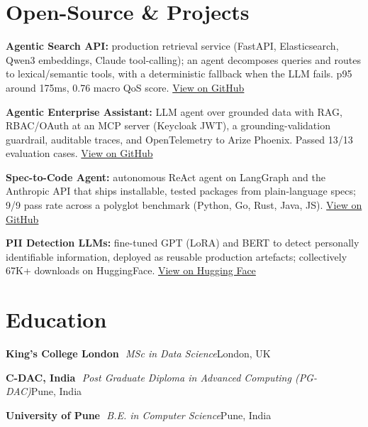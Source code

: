 \documentclass[10pt,a4paper]{article}
\newcommand{\sep}{\,\textcolor{accent!60}{\textbar}\,}
\begin{document}
\section{Open-Source \& Projects}
\begin{tight}
  \item \textbf{Agentic Search API:} production retrieval service (FastAPI, Elasticsearch, Qwen3 embeddings, Claude tool-calling); an agent decomposes queries and routes to lexical/semantic tools, with a deterministic fallback when the LLM fails. p95 around 175ms, 0.76 macro QoS score. \href{https://github.com/abhijeetscode/search-agent}{View on GitHub}
  \item \textbf{Agentic Enterprise Assistant:} LLM agent over grounded data with RAG, RBAC/OAuth at an MCP server (Keycloak JWT), a grounding-validation guardrail, auditable traces, and OpenTelemetry to Arize Phoenix. Passed 13/13 evaluation cases. \href{https://github.com/abhijeetscode/Agentic-Enterprise-Assistant}{View on GitHub}
  \item \textbf{Spec-to-Code Agent:} autonomous ReAct agent on LangGraph and the Anthropic API that ships installable, tested packages from plain-language specs; 9/9 pass rate across a polyglot benchmark (Python, Go, Rust, Java, JS). \href{https://github.com/abhijeetscode/Spec-to-Code-Agent}{View on GitHub}
  \item \textbf{PII Detection LLMs:} fine-tuned GPT (LoRA) and BERT to detect personally identifiable information, deployed as reusable production artefacts; collectively 67K+ downloads on HuggingFace. \href{https://huggingface.co/ab-ai/pii_model}{View on Hugging Face}
\end{tight}

\section{Education}
{\color{company}\bfseries King's College London} \sep {\itshape MSc in Data Science}\hfill {\color{muted}London, UK}\par\vspace{1pt}
{\color{company}\bfseries C-DAC, India} \sep {\itshape Post Graduate Diploma in Advanced Computing (PG-DAC)}\hfill {\color{muted}Pune, India}\par\vspace{1pt}
{\color{company}\bfseries University of Pune} \sep {\itshape B.E. in Computer Science}\hfill {\color{muted}Pune, India}\par
\end{document}
